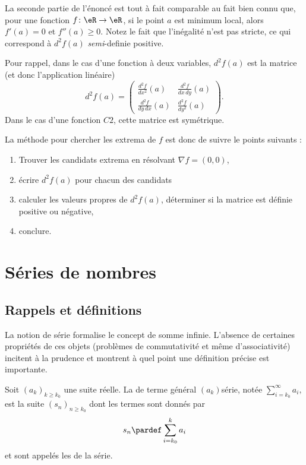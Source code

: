 La seconde partie de l'énoncé est tout à fait comparable au fait bien connu que, pour une fonction $f\colon \eR\to \eR$, si le point $a$ est minimum local, alors $f'(a)=0$ et $f''(a)\geq 0$. Notez le fait que l'inégalité n'est pas stricte, ce qui correspond à $d^2f(a)$ \emph{semi}-definie positive.

Pour rappel, dans le cas d'une fonction à deux variables, $d^2f(a)$ est la matrice (et donc l'application linéaire)
\begin{equation}
	d^2f(a)=\begin{pmatrix}
	\frac{ d^2f  }{ dx^2 }(a)	&	\frac{ d^2f  }{ dx\,dy }(a)	\\ 
	\frac{ d^2f  }{ dy\,dx }(a) 	&	\frac{ d^2f  }{ dy^2 }(a)
\end{pmatrix}.
\end{equation}
Dans le cas d'une fonction $C2$, cette matrice est symétrique.

La méthode pour chercher les extrema de $f$ est donc de suivre le points suivants :
\begin{enumerate}
\item
Trouver les candidats extrema en résolvant $\nabla f=(0,0)$,
\item
écrire $d^2f(a)$ pour chacun des candidats
\item
calculer les valeurs propres de $d^2f(a)$, déterminer si la matrice est définie positive ou négative,
\item
conclure.

\end{enumerate}

\section{Séries de nombres}
\label{secseries}

\subsection{Rappels et définitions}

La notion de série formalise le concept de somme infinie. L'absence de certaines propriétés de ces objets (problèmes de commutativité et même d'associativité) incitent à la prudence et montrent à quel point une définition précise est importante.

Soit ${(a_k)}_{k \geq k_0}$ une suite réelle. La  de terme général $(a_k)${série}, notée
\begin{math}
  \sum_{i=k_0}^\infty a_i,
\end{math}
est la suite ${(s_n)}_{n \geq k_0}$ dont les termes sont donnés par
\begin{equation*}
  s_n \pardef \sum_{i=k_0}^k a_i
\end{equation*}
et sont appelés les  de la série.

